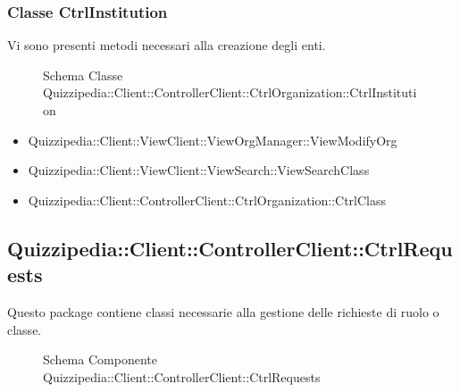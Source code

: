 \subsubsection{Classe CtrlInstitution}
Vi sono presenti metodi necessari alla creazione degli enti.
\begin{figure}[H]
\centering
\noindent{}
\caption{Schema Classe Quizzipedia::Client::ControllerClient::CtrlOrganization::CtrlInstitution}
\end{figure}
\begin{itemize}
\item Quizzipedia::Client::ViewClient::ViewOrgManager::ViewModifyOrg
\item Quizzipedia::Client::ViewClient::ViewSearch::ViewSearchClass
\end{itemize}
\begin{itemize}
\item Quizzipedia::Client::ControllerClient::CtrlOrganization::CtrlClass
\end{itemize}
\subsection{Quizzipedia::Client::ControllerClient::CtrlRequests}
Questo package contiene classi necessarie alla gestione delle richieste di ruolo o classe.
\begin{figure}[H]
\centering
\noindent{}
\caption[Quizzipedia::Client::ControllerClient::CtrlRequests]{Schema Componente Quizzipedia::Client::ControllerClient::CtrlRequests}
\end{figure}
